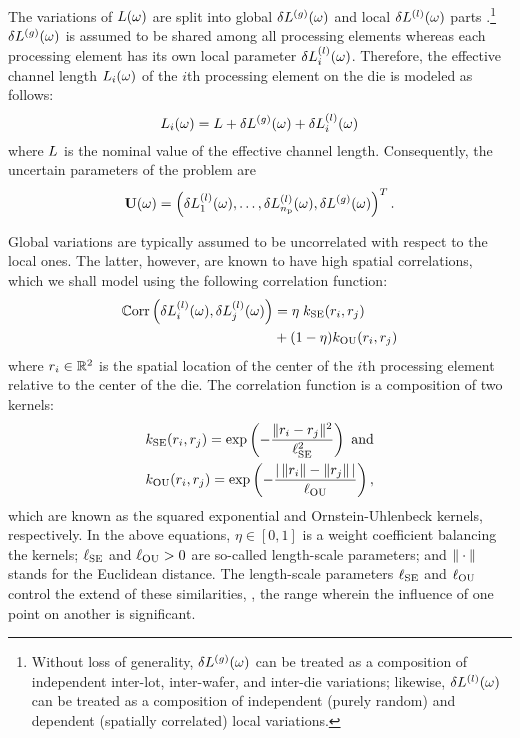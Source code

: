 
The variations of $L(\omega)$ are split into global ${\delta L^{(g)}}(\omega)$ and local $\delta L^{(l)}(\omega)$ parts \cite{chandra2010, shen2009}.\footnote{Without loss of generality, ${\delta L^{(g)}}(\omega)$ can be treated as a composition of independent inter-lot, inter-wafer, and inter-die variations; likewise, $\delta L^{(l)}(\omega)$ can be treated as a composition of independent (purely random) and dependent (spatially correlated) local variations.}
${\delta L^{(g)}}(\omega)$ is assumed to be shared among all processing elements whereas each processing element has its own local parameter $\delta L^{(l)}_i(\omega)$.
Therefore, the effective channel length $L_i(\omega)$ of the $i$th processing element on the die is modeled as follows:
\begin{equation} \elabel{leakage-partition}
  \Leff_i(\o) = \nLeff + \gLeff(\o) + \lLeff_i(\o)
\end{equation}
where $L$ is the nominal value of the effective channel length. Consequently, the uncertain parameters of the problem are
\begin{equation} \elabel{uncertain-parameters}
  \vU(\o) = \vec{\lLeff_1(\o), \dotsc, \lLeff_\nprocs(\o), \gLeff(\o) }.
\end{equation}

Global variations are typically assumed to be uncorrelated with respect to the local ones.
The latter, however, are known to have high spatial correlations, which we shall model using the following correlation function:
\begin{align}
  \oCorr{\lLeff_i(\o), \lLeff_j(\o)} &= \eta \; \fCorr_\SE(\r_i, \r_j) \nonumber \\
  & {} + (1 - \eta) \fCorr_\OU(\r_i, \r_j) \elabel{correlation-function}
\end{align}
where $r_i \in \mathbb{R}^2$ is the spatial location of the center of the $i$th processing element relative to the center of the die. The correlation function is a composition of two kernels:
\begin{align*}
  & \fCorr_\SE(\r_i, \r_j) = \exp\left(-\frac{\norm{\r_i - \r_j}^2}{\ell_\SE^2}\right) \text{ and} \\
  & \fCorr_\OU(\r_i, \r_j) = \exp\left(- \frac{\abs{\,\norm{\r_i} - \norm{\r_j}\,}}{\ell_\OU} \right),
\end{align*}
which are known as the squared exponential and Ornstein-Uhlenbeck kernels, respectively.
In the above equations, $\eta \in [0, 1]$ is a weight coefficient balancing the kernels; $\ell_{\text{SE}}$ and $\ell_{\text{OU}} > 0$ are so-called length-scale parameters; and $\| \cdot \|$ stands for the Euclidean distance.
The length-scale parameters $\ell_{\text{SE}}$ and $\ell_{\text{OU}}$ control the extend of these similarities, \ie, the range wherein the influence of one point on another is significant.

